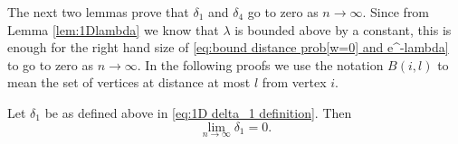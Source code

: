 	The next two lemmas prove that $\delta_1$ and $\delta_4$ go to zero as $n \rightarrow \infty$. Since from Lemma \ref{lem:1Dlambda} we know that $\lambda$ is bounded above by a constant, this is enough for the right hand size of \eqref{eq:bound distance prob[w=0] and e^-lambda} to go to zero as $n \rightarrow \infty$. In the following proofs we use the notation $B(i, l)$ to mean the set of vertices at distance at most $l$ from vertex $i$.

	\begin{lemma}
	\label{lem:delta1 goes to 0}
		Let $\delta_1$ be as defined above in \eqref{eq:1D delta_1 definition}. Then
		\begin{equation}
			\lim_{n\rightarrow\infty} \delta_1 = 0.
		\end{equation}
	\end{lemma}
